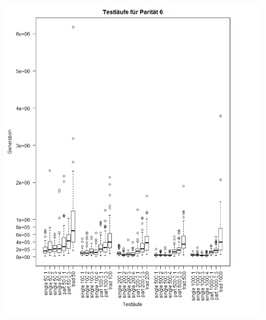 \begin{figure}[h !]
\includegraphics[scale=0.5]{parity6plotzoomed}
\caption[Testläufe Parität 6]{}
\end{figure}

